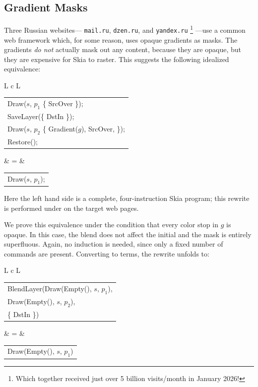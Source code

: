 \documentclass[main.tex]{subfiles}
\begin{document}
\subsection{Gradient Masks}
\label{subsec:grad-masks}

Three Russian websites---%
  \texttt{mail.ru}, \texttt{dzen.ru}, and \texttt{yandex.ru}%
\footnote{
  Which together received just over 5 billion visits/month in January 2026!
}%
  ---use a common web framework which,
  for some reason,
  uses opaque gradients as masks.
The gradients \emph{do not} actually mask out any content,
  because they are opaque,
  but they are expensive for Skia to raster.
This suggests the following idealized equivalence:
\begin{center}
  \begin{tabular}{L c L}
    \begin{tabular}{@{}l@{}}
      Draw($s$, $p_1$ \{ SrcOver \});\\
      SaveLayer(\{ DstIn \});\\
      \quad Draw($s$, $p_2$ \{ Gradient($g$), SrcOver, \Id \});\\
      Restore();
    \end{tabular}
    & = &
    \begin{tabular}{@{}l@{}}
      Draw($s$, $p_1$); \\
    \end{tabular}
  \end{tabular}
\end{center}
Here the left hand side is
  a complete, four-instruction Skia program;
  this rewrite is performed under \SaveLayer
  on the target web pages.

We prove this equivalence under the condition
  that every color stop in $g$ is opaque.
In this case, the \DstIn blend does not affect the initial \Draw
  and the mask is entirely superfluous.
Again, no induction is needed,
  since only a fixed number of \muskia commands are present.
Converting to \Layer terms, the rewrite unfolds to:

\begin{center}
  \begin{tabular}{L c L}
    \begin{tabular}{@{}l@{}}
      BlendLayer(Draw(Empty(), $s$, $p_1$),\\
      \quad \quad Draw(Empty(), $s$, $p_2$),\\
      \quad \quad \{ DstIn \})
    \end{tabular}
    & = &
    \begin{tabular}{@{}l@{}}
      Draw(Empty(), $s$, $p_1$)
    \end{tabular}
  \end{tabular}
\end{center}
\end{document}
